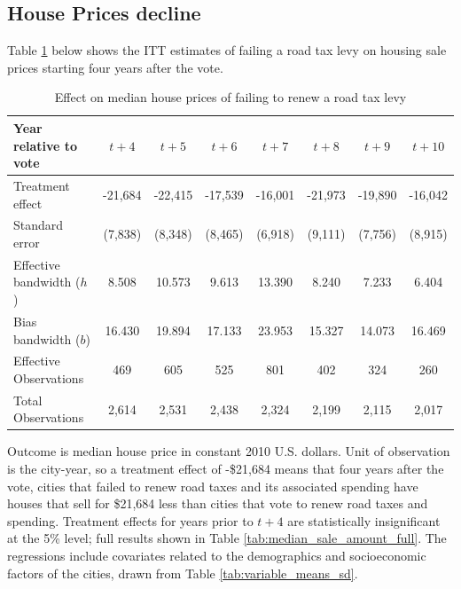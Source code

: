 \subsection{House Prices decline}

 Table \ref{tab:median_sale_amount} below shows the ITT estimates of failing a road tax levy on housing sale prices starting four years after the vote. 

 \begin{table}[ht]
    \centering
    \caption{Effect on median house prices of failing to renew a road tax levy}
    \label{tab:median_sale_amount}
    \begin{tabular}{p{2cm}ccccccc}
        \hline
        Year relative to vote & $t + 4$ & $t + 5$ & $t + 6$ & $t + 7$ & $t + 8$ & $t + 9$ & $t + 10$ \\
        \hline
        Treatment effect & -21,684 & -22,415 & -17,539 & -16,001 & -21,973 & -19,890 & -16,042 \\
        Standard error   & (7,838) & (8,348) & (8,465) & (6,918) & (9,111) & (7,756) & (8,915) \\
        Effective bandwidth ($h$) & 8.508 & 10.573 & 9.613 & 13.390 & 8.240 & 7.233 & 6.404 \\
        Bias bandwidth ($b$) & 16.430 & 19.894 & 17.133 & 23.953 & 15.327 & 14.073 & 16.469 \\
        Effective Observations & 469 & 605 & 525 & 801 & 402 & 324 & 260 \\
        Total Observations & 2,614 & 2,531 & 2,438 & 2,324 & 2,199 & 2,115 & 2,017 \\
        \hline
    \end{tabular}
    \begin{tablenotes}
        \small
        \item Outcome is median house price in constant 2010 U.S. dollars. Unit of observation is the city-year, so a treatment effect of -\$21,684 means that four years after the vote, cities that failed to renew road taxes and its associated spending have houses that sell for \$21,684 less than cities that vote to renew road taxes and spending. Treatment effects for years prior to $t + 4$ are statistically insignificant at the 5\% level; full results shown in Table \ref{tab:median_sale_amount_full}. The regressions include covariates related to the demographics and socioeconomic factors of the cities, drawn from Table \ref{tab:variable_means_sd}.
    \end{tablenotes}
\end{table}


